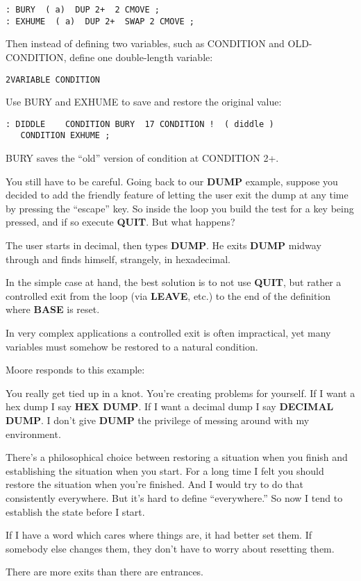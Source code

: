 \begin{verbatim}
: BURY  ( a)  DUP 2+  2 CMOVE ;
: EXHUME  ( a)  DUP 2+  SWAP 2 CMOVE ;
\end{verbatim}

Then instead of defining two variables, such as CONDITION and
OLD-CONDITION, define one double-length variable:

\begin{verbatim}
2VARIABLE CONDITION
\end{verbatim}

Use BURY and EXHUME to save and restore the original value:

\begin{verbatim}
: DIDDLE    CONDITION BURY  17 CONDITION !  ( diddle )
   CONDITION EXHUME ;
\end{verbatim}

BURY saves the ``old'' version of condition at CONDITION 2+.

You still have to be careful. Going back to our \textbf{DUMP} example, suppose
you decided to add the friendly feature of letting the user exit the
dump at any time by pressing the ``escape'' key. So inside the loop you
build the test for a key being pressed, and if so execute \textbf{QUIT}. But what
happens?

The user starts in decimal, then types \textbf{DUMP}. He exits \textbf{DUMP} midway
through and finds himself, strangely, in hexadecimal.

In the simple case at hand, the best solution is to not use \textbf{QUIT}, but
rather a controlled exit from the loop (via \textbf{LEAVE}, etc.) to the end of the
definition where \textbf{BASE} is reset.

In very complex applications a controlled exit is often impractical,
yet many variables must somehow be restored to a natural condition.

\bigskip
\blackline{2ex}
\noindent Moore responds to this example:

\begin{tfquot}
You really get tied up in a knot. You're creating problems for yourself. If I
want a hex dump I say \textbf{HEX DUMP}. If I want a decimal dump I say
\textbf{DECIMAL DUMP}. I don't give \textbf{DUMP} the privilege of messing around
with my environment.

There's a philosophical choice between restoring a situation when you
finish and establishing the situation when you start. For a long time I felt
you should restore the situation when you're finished. And I would try to
do that consistently everywhere. But it's hard to define ``everywhere.'' So
now I tend to establish the state before I start.

If I have a word which cares where things are, it had better set them. If
somebody else changes them, they don't have to worry about resetting
them.

There are more exits than there are entrances.
\end{tfquot}
\blackline{1ex}

